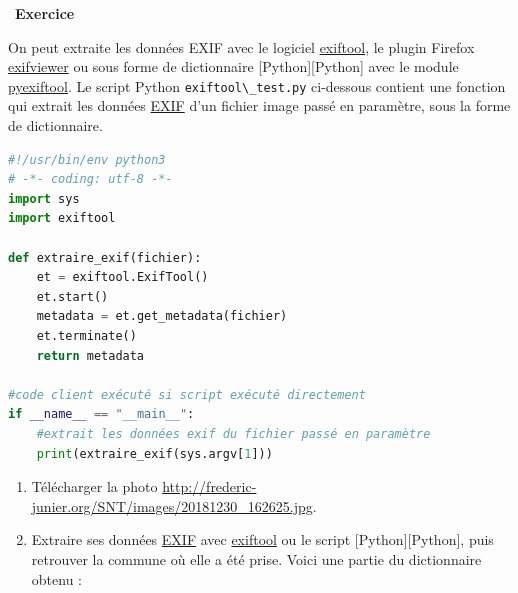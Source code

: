 \documentclass[
  11pt,
]{article}
\newcommand{\passthrough}[1]{#1}
\providecommand{\tightlist}{%
  \setlength{\itemsep}{0pt}\setlength{\parskip}{0pt}}
\newcounter{exo}
\newenvironment{exercice}[1]
{\par \medskip   \addtocounter{exo}{1} \noindent  
\begin{bclogo}[arrondi =0.1,   noborder = true, logo=\bccrayon, marge=4]{~\textbf{Exercice} \textbf{\theexo} {\itshape #1} }  \par}
{
\end{bclogo}
 \par \bigskip }
\newcounter{def}
\newcounter{logi}
\begin{document}
\begin{exercice}{}

On peut extraite les données EXIF avec le logiciel
\href{https://exiftool.org/}{exiftool}, le plugin Firefox
\href{https://addons.mozilla.org/fr/firefox/addon/exif-viewer/}{exifviewer}
ou sous forme de dictionnaire {[}Python{]}{[}Python{]} avec le module
\href{https://smarnach.githeub.io/pyexiftool/}{pyexiftool}. Le script
Python \passthrough{\lstinline!exiftool\_test.py!} ci-dessous contient
une fonction qui extrait les données
\href{https://fr.wikipedia.org/wiki/Exchangeable_image_file_format}{EXIF}
d'un fichier image passé en paramètre, sous la forme de dictionnaire.

\begin{lstlisting}[language=Python]
#!/usr/bin/env python3
# -*- coding: utf-8 -*-
import sys
import exiftool

def extraire_exif(fichier):
    et = exiftool.ExifTool()
    et.start()
    metadata = et.get_metadata(fichier)
    et.terminate()
    return metadata

#code client exécuté si script exécuté directement
if __name__ == "__main__": 
    #extrait les données exif du fichier passé en paramètre
    print(extraire_exif(sys.argv[1]))
\end{lstlisting}

\begin{enumerate}
\def\labelenumi{\arabic{enumi}.}
\tightlist
\item
  Télécharger la photo
  \url{http://frederic-junier.org/SNT/images/20181230_162625.jpg}.
\item
  Extraire ses données
  \href{https://fr.wikipedia.org/wiki/Exchangeable_image_file_format}{EXIF}
  avec \href{https://exiftool.org/}{exiftool} ou le script
  {[}Python{]}{[}Python{]}, puis retrouver la commune où elle a été
  prise. Voici une partie du dictionnaire obtenu :
\end{enumerate}


\end{exercice}
\end{document}
